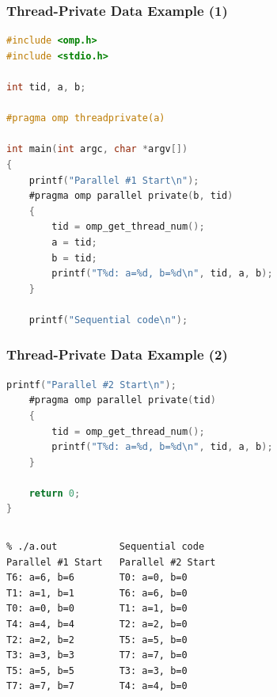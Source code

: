 \begin{frame}[fragile]
  \frametitle{Thread-Private Data Example (1)}

  
  \begin{lstlisting}[language=C,morekeywords={foreach,pragma,omp,parallel,single,nowait,task,untied,barrier,taskyield}]
#include <omp.h>
#include <stdio.h>

int tid, a, b;

#pragma omp threadprivate(a)

int main(int argc, char *argv[])
{
    printf("Parallel #1 Start\n");
    #pragma omp parallel private(b, tid)
    {
        tid = omp_get_thread_num();
        a = tid;
        b = tid;
        printf("T%d: a=%d, b=%d\n", tid, a, b);
    }

    printf("Sequential code\n");
  \end{lstlisting}
  


\end{frame}

\begin{frame}[fragile]
  \frametitle{Thread-Private Data Example (2)}

  
  \begin{lstlisting}[language=C,morekeywords={foreach,pragma,omp,parallel,single,nowait,task,untied,barrier,taskyield}]
    printf("Parallel #2 Start\n");
    #pragma omp parallel private(tid)
    {
        tid = omp_get_thread_num();
        printf("T%d: a=%d, b=%d\n", tid, a, b);
    }

    return 0;
}    
  \end{lstlisting}
  
  
  \begin{center}
    \begin{columns}[c]
      \column{1.5in}
        \begin{lstlisting}
% ./a.out
Parallel #1 Start
T6: a=6, b=6
T1: a=1, b=1
T0: a=0, b=0
T4: a=4, b=4
T2: a=2, b=2
T3: a=3, b=3
T5: a=5, b=5
T7: a=7, b=7
        \end{lstlisting}
      \column{1.5in}
        \begin{lstlisting}
Sequential code
Parallel #2 Start
T0: a=0, b=0
T6: a=6, b=0
T1: a=1, b=0
T2: a=2, b=0
T5: a=5, b=0
T7: a=7, b=0
T3: a=3, b=0
T4: a=4, b=0
        \end{lstlisting}
    \end{columns}
  \end{center}
\end{frame}

